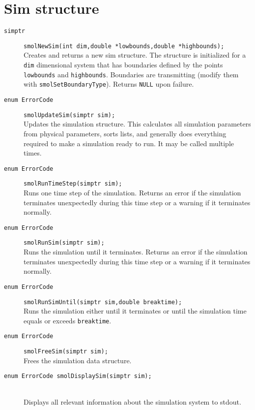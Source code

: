 \documentclass {book}
\begin{document}
\section{Sim structure}

\begin{description}

\item[\texttt{simptr}]
\texttt{smolNewSim(int dim,double *lowbounds,double *highbounds);}
\hfill \\
Creates and returns a new sim structure.  The structure is initialized for a \texttt{dim} dimensional system that has boundaries defined by the points \texttt{lowbounds} and \texttt{highbounds}.  Boundaries are transmitting (modify them with \texttt{smolSetBoundaryType}).  Returns \texttt{NULL} upon failure.

\item[\texttt{enum ErrorCode}]
\texttt{smolUpdateSim(simptr sim);}
\hfill \\
Updates the simulation structure.  This calculates all simulation parameters from physical parameters, sorts lists, and generally does everything required to make a simulation ready to run.  It may be called multiple times.

\item[\texttt{enum ErrorCode}]
\texttt{smolRunTimeStep(simptr sim);}
\hfill \\
Runs one time step of the simulation.  Returns an error if the simulation terminates unexpectedly during this time step or a warning if it terminates normally.

\item[\texttt{enum ErrorCode}]
\texttt{smolRunSim(simptr sim);}
\hfill \\
Runs the simulation until it terminates.  Returns an error if the simulation terminates unexpectedly during this time step or a warning if it terminates normally.

\item[\texttt{enum ErrorCode}]
\texttt{smolRunSimUntil(simptr sim,double breaktime);}
\hfill \\
Runs the simulation either until it terminates or until the simulation time equals or exceeds \texttt{breaktime}.

\item[\texttt{enum ErrorCode}]
\texttt{smolFreeSim(simptr sim);}
\hfill \\
Frees the simulation data structure.

\item[\texttt{enum ErrorCode smolDisplaySim(simptr sim);}]
\hfill \\
Displays all relevant information about the simulation system to stdout.

\end{description}
\end{document}
